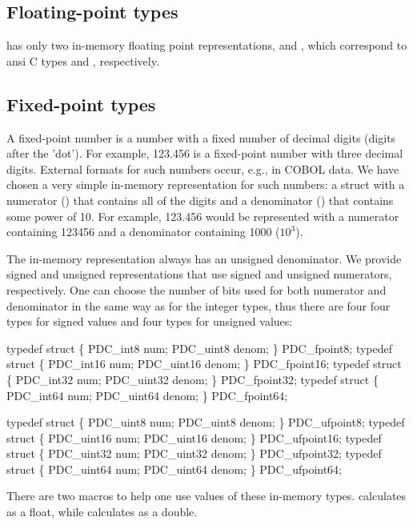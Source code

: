 \subsection{Floating-point types}

\PADSL{} has only two in-memory floating point representations,
 and , which correspond to ansi C types 
and , respectively.

\subsection{Fixed-point types}

A fixed-point number is a number with a fixed number of decimal digits
(digits after the 'dot').  For example, 123.456 is a fixed-point
number with three decimal digits.  External formats for such numbers
occur, e.g., in COBOL data.  We have chosen a very simple in-memory
representation for such numbers: a struct with a numerator ()
that contains all of the digits and a denominator () that
contains some power of 10.  For example, 123.456 would be represented
with a numerator containing 123456 and a denominator containing 1000 ($10^3$).

The in-memory representation always has an unsigned denominator. We
provide signed and unsigned representations that use signed and
unsigned numerators, respectively.  One can choose the number of bits
used for both numerator and denominator in the same way as for the
integer types, thus there are four four types for signed values
and four types for unsigned values:

\begin{tinycodeaux}{\leftmargin=0in}
typedef struct \{ PDC_int8   num; PDC_uint8  denom; \} PDC_fpoint8;
typedef struct \{ PDC_int16  num; PDC_uint16 denom; \} PDC_fpoint16;
typedef struct \{ PDC_int32  num; PDC_uint32 denom; \} PDC_fpoint32;
typedef struct \{ PDC_int64  num; PDC_uint64 denom; \} PDC_fpoint64;

typedef struct \{ PDC_uint8  num; PDC_uint8  denom; \} PDC_ufpoint8;
typedef struct \{ PDC_uint16 num; PDC_uint16 denom; \} PDC_ufpoint16;
typedef struct \{ PDC_uint32 num; PDC_uint32 denom; \} PDC_ufpoint32;
typedef struct \{ PDC_uint64 num; PDC_uint64 denom; \} PDC_ufpoint64;
\end{tinycodeaux}

There are two macros to help one use values of these in-memory types.
 calculates  as a float,
while  calculates  as a double.

